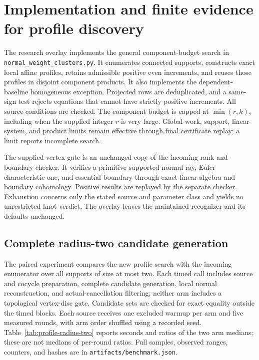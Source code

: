 \section{Implementation and finite evidence for profile discovery}
\label{sec:profile-evidence}

The research overlay implements the general component-budget search in
\texttt{normal\_weight\_clusters.py}.  It enumerates connected supports,
constructs exact local affine profiles, retains admissible positive even
increments, and reuses those profiles in disjoint component products.
It also implements the dependent-baseline homogeneous exception.
Projected rows are deduplicated, and a same-sign test rejects equations
that cannot have strictly positive increments.  All source conditions
are checked.  The component budget is capped at $\min(r,k)$, including
when the supplied integer $r$ is very large.  Global work, support,
linear-system, and product limits remain effective through final
certificate replay; a limit reports incomplete search.

The supplied vertex gate is an unchanged copy of the incoming
rank-and-boundary checker.  It verifies a primitive supported normal
ray, Euler characteristic one, and essential boundary through exact
linear algebra and boundary cohomology.  Positive results are replayed
by the separate checker.  Exhaustion concerns only the stated source
and parameter class and yields no unrestricted knot verdict.  The
overlay leaves the maintained recognizer and its defaults unchanged.

\subsection{Complete radius-two candidate generation}

The paired experiment compares the new profile search with the incoming
enumerator over all supports of size at most two.  Each timed call
includes source and cocycle preparation, complete candidate generation,
local normal reconstruction, and actual-cancellation filtering; neither
arm includes a topological vertex-disc gate.  Candidate sets are checked
for exact equality outside the timed blocks.  Each source receives one
excluded warmup per arm and five measured rounds, with arm order
shuffled using a recorded seed.  Table~\ref{tab:profile-radius-two}
reports seconds and ratios of the two arm medians; these are not medians
of per-round ratios.  Full samples, observed ranges, counters, and hashes
are in \texttt{artifacts/benchmark.json}.

